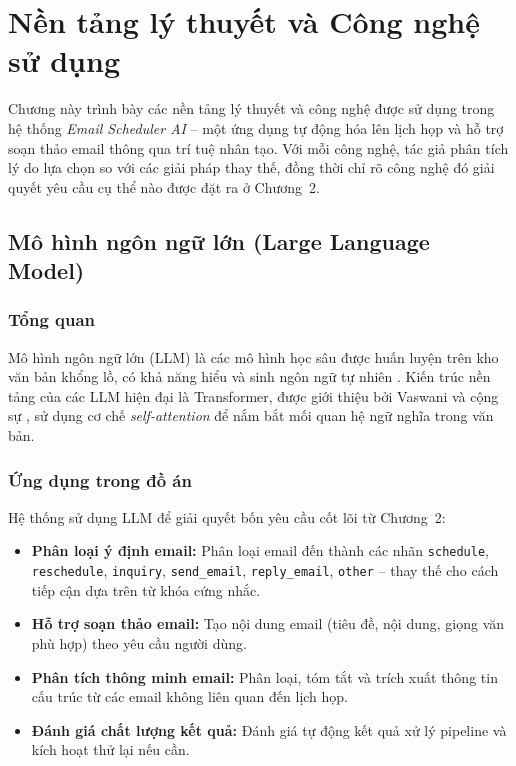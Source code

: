 \documentclass[../DoAn.tex]{subfiles}
\begin{document}
\chapter{Nền tảng lý thuyết và Công nghệ sử dụng}

Chương này trình bày các nền tảng lý thuyết và công nghệ được sử dụng trong hệ thống \textit{Email Scheduler AI} -- một ứng dụng tự động hóa lên lịch họp và hỗ trợ soạn thảo email thông qua trí tuệ nhân tạo. Với mỗi công nghệ, tác giả phân tích lý do lựa chọn so với các giải pháp thay thế, đồng thời chỉ rõ công nghệ đó giải quyết yêu cầu cụ thể nào được đặt ra ở Chương~2.

\section{Mô hình ngôn ngữ lớn (Large Language Model)}

\subsection{Tổng quan}

Mô hình ngôn ngữ lớn (LLM) là các mô hình học sâu được huấn luyện trên kho văn bản khổng lồ, có khả năng hiểu và sinh ngôn ngữ tự nhiên \cite{brown2020gpt3}. Kiến trúc nền tảng của các LLM hiện đại là Transformer, được giới thiệu bởi Vaswani và cộng sự \cite{vaswani2017attention}, sử dụng cơ chế \textit{self-attention} để nắm bắt mối quan hệ ngữ nghĩa trong văn bản.

\subsection{Ứng dụng trong đồ án}

Hệ thống sử dụng LLM để giải quyết bốn yêu cầu cốt lõi từ Chương~2:
\begin{itemize}
    \item \textbf{Phân loại ý định email:} Phân loại email đến thành các nhãn \texttt{schedule}, \texttt{reschedule}, \texttt{inquiry}, \texttt{send\_email}, \texttt{reply\_email}, \texttt{other} -- thay thế cho cách tiếp cận dựa trên từ khóa cứng nhắc.
    \item \textbf{Hỗ trợ soạn thảo email:} Tạo nội dung email (tiêu đề, nội dung, giọng văn phù hợp) theo yêu cầu người dùng.
    \item \textbf{Phân tích thông minh email:} Phân loại, tóm tắt và trích xuất thông tin cấu trúc từ các email không liên quan đến lịch họp.
    \item \textbf{Đánh giá chất lượng kết quả:} Đánh giá tự động kết quả xử lý pipeline và kích hoạt thử lại nếu cần.
\end{itemize}
\end{document}
